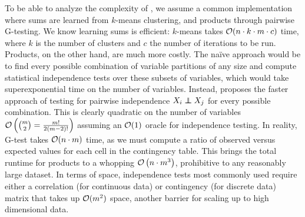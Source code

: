 To be able to analyze the complexity of , we assume a common implementation
where sums are learned from $k$-means clustering, and products through pairwise G-testing. We know
learning sums is efficient: $k$-means takes $\mathcal{O}(n\cdot k\cdot m\cdot c)$ time, where $k$ is the
number of clusters and $c$ the number of iterations to be run. Products, on the other hand, are
much more costly. The naïve approach would be to find every possible combination of variable
partitions of any size and compute statistical independence tests over these subsets of variables,
which would take superexponential time on the number of variables. Instead, 
proposes the faster approach of testing for pairwise independence $X_i\indep X_j$ for every
possible combination. This is clearly quadratic on the number of variables
$\mathcal{O}\left(\binom{m}{2}=\frac{m!}{2(m-2)!}\right)$ assuming an $\mathcal{O}(1)$ oracle for independence
testing. In reality, G-test takes $\mathcal{O}(n\cdot m)$ time, as we must compute a ratio of observed
versus expected values for each cell in the contingency table. This brings the total runtime for
products to a whopping $\mathcal{O}\left(n\cdot m^3\right)$, prohibitive to any reasonably large dataset.
In terms of space, independence tests most commonly used require either a correlation (for
continuous data) or contingency (for discrete data) matrix that takes up $\mathcal{O}(m^2)$ space,
another barrier for scaling up to high dimensional data.

